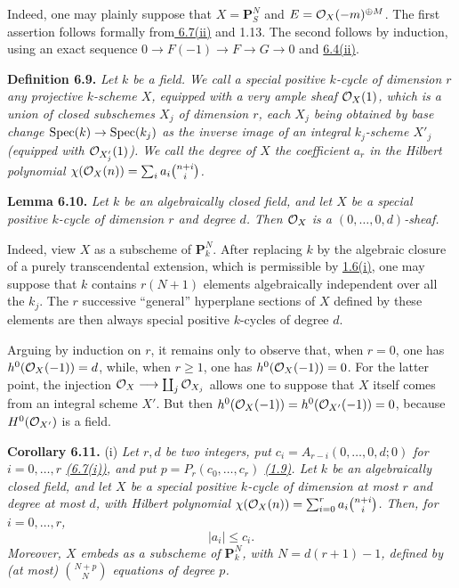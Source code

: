 Indeed, one may plainly suppose that $X=\mathbf P^N_S$ and
$E=\mathcal O_X(-m)^{\oplus M}$. The first assertion follows formally from\hyperlink{sga6.e13.thm.6-7}{
6.7(ii)} and 1.13. The second follows by induction, using an exact sequence
$0\longrightarrow F(-1)\longrightarrow F\longrightarrow G\longrightarrow0$
and \hyperlink{sga6.e13.thm.6-4}{6.4(ii)}.

\textbf{Definition 6.9.} \emph{Let $k$ be a field. We call a
\emph{special positive $k$-cycle of dimension $r$} any projective
$k$-scheme $X$, equipped with a very ample sheaf $\mathcal O_X(1)$, which is a
union of closed subschemes $X_j$ of dimension $r$, each $X_j$ being
obtained by base change $\operatorname{Spec}(k)\to\operatorname{Spec}(k_j)$ as the inverse image of
an integral $k_j$-scheme $X'_j$ (equipped with $\mathcal O_{X'_j}(1)$). We call
the \emph{degree} of $X$ the coefficient $a_r$ in the Hilbert polynomial
$\chi(\mathcal O_X(n))=\sum_i a_i\binom{n+i}{i}$.}

\textbf{Lemma 6.10.} \emph{Let $k$ be an algebraically closed field, and let $X$ be a special positive $k$-cycle of dimension $r$ and degree $d$. Then $\mathcal O_X$ is a $(0,\ldots,0,d)$-sheaf.}

Indeed, view $X$ as a subscheme of $\mathbf P^N_k$. After replacing $k$ by the algebraic closure of a purely transcendental extension, which is permissible by \hyperlink{sga6.e13.prop.1-6}{1.6(i)}, one may suppose that $k$ contains $r(N+1)$ elements algebraically independent over all the $k_j$. The $r$ successive ``general'' hyperplane sections of $X$ defined by these elements are then always special positive $k$-cycles of degree $d$.

Arguing by induction on $r$, it remains only to observe that, when $r=0$,
one has $h^0(\mathcal O_X(-1))=d$, while, when $r\geq1$, one has
$h^0(\mathcal O_X(-1))=0$. For the latter point, the injection
$\mathcal O_X\longrightarrow\coprod_j\mathcal O_{X_j}$ allows one to suppose that $X$
itself comes from an integral scheme $X'$. But then
$h^0(\mathcal O_X(-1))=h^0(\mathcal O_{X'}(-1))=0$, because $H^0(\mathcal O_{X'})$ is a
field.

\textbf{Corollary 6.11.} (i) \emph{Let $r,d$ be two integers, put
$c_i=A_{r-i}(0,\ldots,0,d;0)$ for $i=0,\ldots,r$ \hyperlink{sga6.e13.thm.6-7}{(6.7(i))}, and put
$p=P_r(c_0,\ldots,c_r)$ \hyperlink{sga6.e13.def.1-9}{(1.9)}. Let $k$ be an algebraically closed field,
and let $X$ be a special positive $k$-cycle of dimension at most $r$ and
degree at most $d$, with Hilbert polynomial
$\chi(\mathcal O_X(n))=\sum_{i=0}^{r}a_i\binom{n+i}{i}$. Then, for
$i=0,\ldots,r$,}
\[
  |a_i|\leq c_i.
\]
\emph{Moreover, $X$ embeds as a subscheme of $\mathbf P^N_k$, with
$N=d(r+1)-1$, defined by (at most) $\binom{N+p}{N}$ equations of degree
$p$.}

